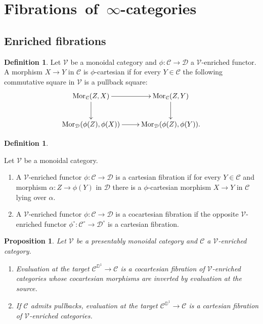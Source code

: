 \documentclass[10pt,oneside]{article}
\numberwithin{equation}{section} %
\numberwithin{figure}{section} %
\theoremstyle{plain}
\newtheorem{proposition}[theorem]{Proposition}
\theoremstyle{definition}
\newtheorem{definition}[theorem]{Definition}
\newcommand{\bD}{{\mathbb D}}
\newcommand{\mC}{{\mathcal C}}
\newcommand{\mD}{{\mathcal D}}
\newcommand{\mV}{{\mathcal V}}
\newcommand{\Mor}{{\mathrm{Mor}}}
\begin{document}
\section{\mbox{Fibrations of $\infty$-categories}}

\subsection{Enriched fibrations}

\begin{definition}

Let $\mV$ be a monoidal category
and $\phi: \mC \to \mD$ a $\mV$-enriched functor.
A morphism $X \to Y$ in $\mC$ is $\phi$-cartesian if for every $Y\in \mC$ the following commutative square in $\mV$ is a pullback square:
$$\begin{xy}
\xymatrix{
\Mor_\mC(Z,X) \ar[d]^{} \ar[r]
& \Mor_\mC(Z,Y) \ar[d]
\\ 
\Mor_\mD(\phi(Z),\phi(X)) \ar[r] & \Mor_\mD(\phi(Z),\phi(Y)).}
\end{xy}$$
   
\end{definition}

\begin{definition}\label{enrfibr}

Let $\mV$ be a monoidal category.

\begin{enumerate}[\normalfont(1)]\setlength{\itemsep}{-2pt}
\item A $\mV$-enriched functor $\phi: \mC \to \mD$ is a cartesian fibration if for every $Y \in \mC$ and morphism $\alpha: Z \to \phi(Y)$ in $\mD$ there is a $\phi$-cartesian morphism $X \to Y$ in $\mC$ lying over $\alpha.$

\item A $\mV$-enriched functor $\phi: \mC \to \mD$ is a cocartesian fibration if the opposite $\mV$-enriched functor $\phi^\circ: \mC^\circ \to \mD^\circ $ is a cartesian fibration.

\end{enumerate}

\end{definition}



\begin{proposition}\label{enrtargetfibr}
Let $\mV$ be a presentably monoidal category and $\mC$ a $\mV$-enriched category.
\begin{enumerate}[\normalfont(1)]\setlength{\itemsep}{-2pt}
\item Evaluation at the target $\mC^{\bD^1} \to \mC$ is a cocartesian fibration of $\mV$-enriched categories whose cocartesian morphisms are inverted by evaluation at the source.

\item If $\mC$ admits pullbacks, evaluation at the target $\mC^{\bD^1} \to \mC$ is a cartesian fibration of $\mV$-enriched categories.
\end{enumerate}
    
\end{proposition}
\end{document}
